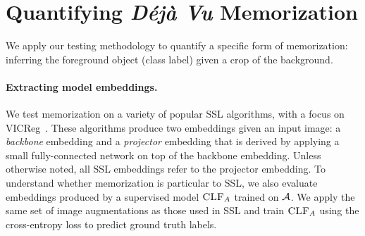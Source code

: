 \section{Quantifying \emph{Déjà Vu} Memorization}
\label{sec:quant}

We apply our testing methodology to quantify a specific form of \dejavu memorization: inferring the foreground object (class label) given a crop of the background.

\vspace{-0.75em}
\paragraph{Extracting model embeddings.} We test \dejavu memorization on a variety of popular SSL algorithms, with a focus on VICReg~\citep{vicreg}. These algorithms produce two embeddings given an input image: a \emph{backbone} embedding and a \emph{projector} embedding that is derived by applying a small fully-connected network on top of the backbone embedding. Unless otherwise noted, all SSL embeddings refer to the projector embedding. 
To understand whether \dejavu memorization is particular to SSL, we also evaluate embeddings produced by a supervised model $\textsc{CLF}_A$ trained on $\mathcal{A}$. We apply the same set of image augmentations as those used in SSL and train $\textsc{CLF}_A$ using the cross-entropy loss to predict ground truth labels. 
\vspace{-0.75em}
